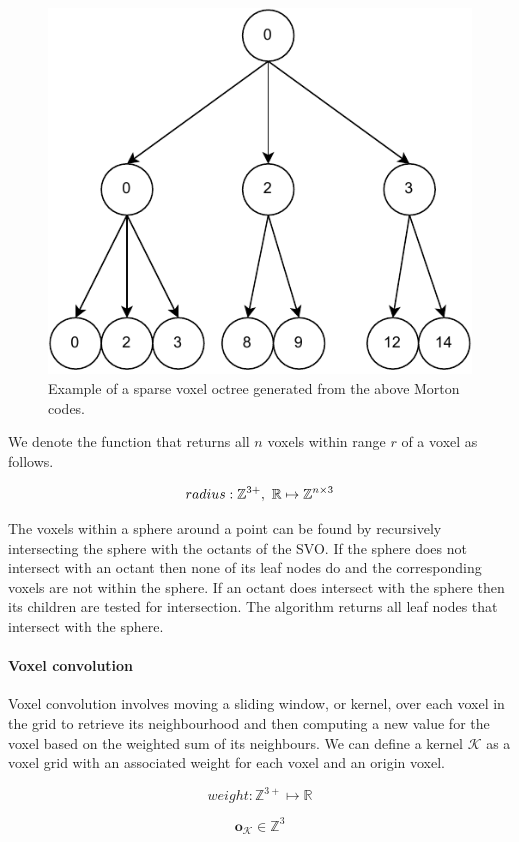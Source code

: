 \begin{figure}[h]
    \centering
    \includegraphics*[width=.5\textwidth]{./fig/svo.pdf}
    \caption{Example of a sparse voxel octree generated from the above Morton codes.}
    \label{fig:vg_svo}
\end{figure}

We denote the function that returns all \(n\) voxels within range \(r\) of a voxel as follows.

\begin{equation}
    radius: \mathbb{Z}^{3+},\ \mathbb{R} \mapsto \mathbb{Z}^{n \times 3}
\end{equation}

The voxels within a sphere around a point can be found by recursively intersecting the sphere with the octants of the SVO. If the sphere does not intersect with an octant then none of its leaf nodes do and the corresponding voxels are not within the sphere. If an octant does intersect with the sphere then its children are tested for intersection. The algorithm returns all leaf nodes that intersect with the sphere.

\paragraph{Voxel convolution}
Voxel convolution involves moving a sliding window, or kernel, over each voxel in the grid to retrieve its neighbourhood and then computing a new value for the voxel based on the weighted sum of its neighbours. We can define a kernel \(\mathcal{K}\) as a voxel grid with an associated weight for each voxel and an origin voxel.

\begin{equation}
weight: \mathbb{Z}^{3+} \mapsto \mathbb{R}
\end{equation}

\begin{equation}
\boldsymbol{o}_{\mathcal{K}} \in \mathbb{Z}^{3}
\end{equation}

